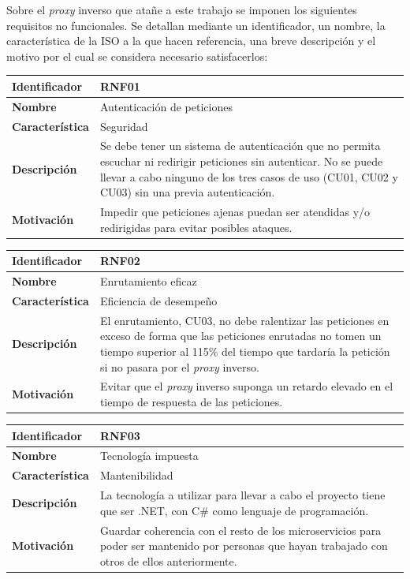 \documentclass[11pt,spanish,listoffigures]{tfgetsinf}
\begin{document}
Sobre el \emph{proxy} inverso que atañe a este trabajo se imponen los siguientes requisitos no funcionales. Se detallan mediante un identificador, un nombre, la característica de la ISO a la que hacen referencia, una breve descripción y el motivo por el cual se considera necesario satisfacerlos:

\begin{center} \begin{tabular}{| l | p{11.3cm} |}
\hline
\textbf{Identificador} & RNF01
\\ \hline
\textbf{Nombre} & Autenticación de peticiones
\\ \hline
\textbf{Característica} & Seguridad
\\ \hline
\textbf{Descripción} & Se debe tener un sistema de autenticación que no permita escuchar ni redirigir peticiones sin autenticar. No se puede llevar a cabo ninguno de los tres casos de uso (CU01, CU02 y CU03) sin una previa autenticación.
\\ \hline
\textbf{Motivación} & Impedir que peticiones ajenas puedan ser atendidas y/o redirigidas para evitar posibles ataques.
\\ \hline \end{tabular} \end{center}

\begin{center} \begin{tabular}{| l | p{11.3cm} |}
\hline
\textbf{Identificador} & RNF02
\\ \hline
\textbf{Nombre} & Enrutamiento eficaz
\\ \hline
\textbf{Característica} & Eficiencia de desempeño
\\ \hline
\textbf{Descripción} & El enrutamiento, CU03, no debe ralentizar las peticiones en exceso de forma que las peticiones enrutadas no tomen un tiempo superior al 115\% del tiempo que tardaría la petición si no pasara por el \emph{proxy} inverso.
\\ \hline
\textbf{Motivación} & Evitar que el \emph{proxy} inverso suponga un retardo elevado en el tiempo de respuesta de las peticiones.
\\ \hline \end{tabular} \end{center}

\begin{center} \begin{tabular}{| l | p{11.3cm} |}
\hline
\textbf{Identificador} & RNF03
\\ \hline
\textbf{Nombre} & Tecnología impuesta
\\ \hline
\textbf{Característica} & Mantenibilidad
\\ \hline
\textbf{Descripción} & La tecnología a utilizar para llevar a cabo el proyecto tiene que ser .NET, con C\# como lenguaje de programación.
\\ \hline
\textbf{Motivación} & Guardar coherencia con el resto de los microservicios para poder ser mantenido por personas que hayan trabajado con otros de ellos anteriormente.
\\ \hline \end{tabular} \end{center}
\end{document}
